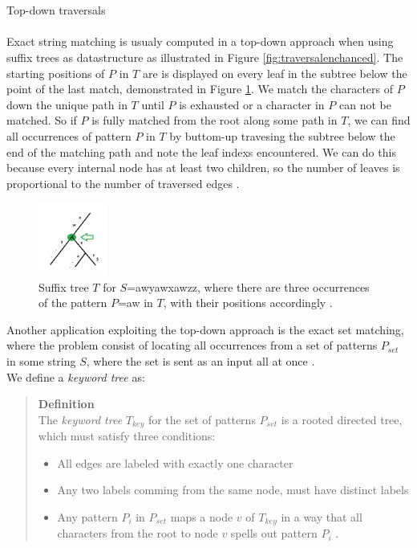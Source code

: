 \documentclass[12pt]{article} %
\begin{document}
\\ \\
Top-down traversals
\\ \\
Exact string matching is usualy computed in a top-down approach when using suffix trees as datastructure as illustrated in Figure \ref{fig:traversalenchanced}.
The starting positions of $P$ in $T$ are is displayed on every leaf in the subtree below the point of the last match, demonstrated in Figure \ref{fig:ExactMatching}. We match the characters of $P$ down the unique path in $T$ until $P$ is exhausted or a character in $P$ can not be matched. So if $P$ is fully matched from the root along some path in $T$, we can find all occurrences of pattern $P$ in $T$ by buttom-up travesing the subtree below the end of the matching path and note the leaf indexs encountered. We can do this because every internal node has at least two children, so the number of leaves is proportional to the number of traversed edges \cite{gusfield}.

\begin{figure}[H]
    \centering
    \includegraphics[width=0.2\textwidth]{ExactMatching}
    \captionsetup{width=0.8
    \textwidth}
    \caption{Suffix tree $T$ for $S$=awyawxawzz, where there are three occurrences of the pattern $P$=aw in $T$, with their positions accordingly \cite{gusfield}.}
    \label{fig:ExactMatching}
\end{figure}

Another application exploiting the top-down approach is the exact set matching, where the problem consist of locating all occurrences from a set of patterns $P_{set}$ in some string $S$, where the set is sent as an input all at once \cite{gusfield}. \\ We define a \emph{keyword tree} as:

\begin{quote}
\textbf{Definition} \\
The \emph{keyword tree} $T_{key}$ for the set of patterns $P_{set}$ is a rooted directed tree, which must satisfy three conditions:
\begin{itemize}  
\item All edges are labeled with exactly one character
\item Any two labels comming from the same node, must have distinct labels
\item Any pattern $P_i$ in $P_{set}$ maps a node $v$ of $T_{key}$ in a way that all characters from the root to node $v$ spells out pattern $P_i$ \cite{gusfield}.
\end{itemize}
\end{quote}
\end{document}
